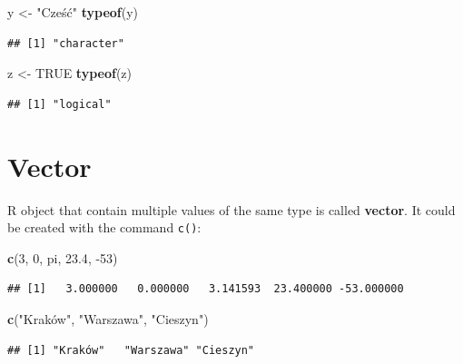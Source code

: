 \documentclass[
]{book}
\newenvironment{Shaded}{\begin{snugshade}}{\end{snugshade}}
\newcommand{\DecValTok}[1]{\textcolor[rgb]{0.00,0.00,0.81}{#1}}
\newcommand{\FloatTok}[1]{\textcolor[rgb]{0.00,0.00,0.81}{#1}}
\newcommand{\KeywordTok}[1]{\textcolor[rgb]{0.13,0.29,0.53}{\textbf{#1}}}
\newcommand{\NormalTok}[1]{#1}
\newcommand{\OtherTok}[1]{\textcolor[rgb]{0.56,0.35,0.01}{#1}}
\newcommand{\StringTok}[1]{\textcolor[rgb]{0.31,0.60,0.02}{#1}}
\begin{document}
\begin{Shaded}
\begin{Highlighting}[]
\NormalTok{y <-}\StringTok{ "Cześć"}
\KeywordTok{typeof}\NormalTok{(y)}
\end{Highlighting}
\end{Shaded}

\begin{verbatim}
## [1] "character"
\end{verbatim}

\begin{Shaded}
\begin{Highlighting}[]
\NormalTok{z <-}\StringTok{ }\OtherTok{TRUE}
\KeywordTok{typeof}\NormalTok{(z)}
\end{Highlighting}
\end{Shaded}

\begin{verbatim}
## [1] "logical"
\end{verbatim}

\hypertarget{vector}{%
\section{Vector}\label{vector}}

R object that contain multiple values of the same type is called \textbf{vector}. It could be created with the command \texttt{c()}:

\begin{Shaded}
\begin{Highlighting}[]
\KeywordTok{c}\NormalTok{(}\DecValTok{3}\NormalTok{, }\DecValTok{0}\NormalTok{, pi, }\FloatTok{23.4}\NormalTok{, }\DecValTok{-53}\NormalTok{)}
\end{Highlighting}
\end{Shaded}

\begin{verbatim}
## [1]   3.000000   0.000000   3.141593  23.400000 -53.000000
\end{verbatim}

\begin{Shaded}
\begin{Highlighting}[]
\KeywordTok{c}\NormalTok{(}\StringTok{"Kraków", "}\NormalTok{Warszawa}\StringTok{", "}\NormalTok{Cieszyn}\StringTok{")}
\end{Highlighting}
\end{Shaded}

\begin{verbatim}
## [1] "Kraków"   "Warszawa" "Cieszyn"
\end{verbatim}
\end{document}
